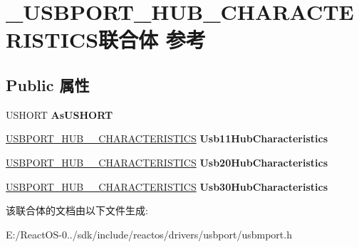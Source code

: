 \hypertarget{union___u_s_b_p_o_r_t___h_u_b___c_h_a_r_a_c_t_e_r_i_s_t_i_c_s}{}\section{\+\_\+\+U\+S\+B\+P\+O\+R\+T\+\_\+\+H\+U\+B\+\_\+\+C\+H\+A\+R\+A\+C\+T\+E\+R\+I\+S\+T\+I\+C\+S联合体 参考}
\label{union___u_s_b_p_o_r_t___h_u_b___c_h_a_r_a_c_t_e_r_i_s_t_i_c_s}
\subsection*{Public 属性}
\begin{DoxyCompactItemize}
\item 
\mbox{\label{union___u_s_b_p_o_r_t___h_u_b___c_h_a_r_a_c_t_e_r_i_s_t_i_c_s_a423d6c5ab8e0105af3857dd810dcba65}} 
U\+S\+H\+O\+RT {\bfseries As\+U\+S\+H\+O\+RT}
\item 
\mbox{\label{union___u_s_b_p_o_r_t___h_u_b___c_h_a_r_a_c_t_e_r_i_s_t_i_c_s_a807bce0510d0d5f481284a3efd21d9ec}} 
\hyperlink{union___u_s_b_p_o_r_t___h_u_b__11___c_h_a_r_a_c_t_e_r_i_s_t_i_c_s}{U\+S\+B\+P\+O\+R\+T\+\_\+\+H\+U\+B\+\_\+\_\+\+C\+H\+A\+R\+A\+C\+T\+E\+R\+I\+S\+T\+I\+CS} {\bfseries Usb11\+Hub\+Characteristics}
\item 
\mbox{\label{union___u_s_b_p_o_r_t___h_u_b___c_h_a_r_a_c_t_e_r_i_s_t_i_c_s_a79d53265692cd0e065828c2fc638d82f}} 
\hyperlink{union___u_s_b_p_o_r_t___h_u_b__20___c_h_a_r_a_c_t_e_r_i_s_t_i_c_s}{U\+S\+B\+P\+O\+R\+T\+\_\+\+H\+U\+B\+\_\+\_\+\+C\+H\+A\+R\+A\+C\+T\+E\+R\+I\+S\+T\+I\+CS} {\bfseries Usb20\+Hub\+Characteristics}
\item 
\mbox{\label{union___u_s_b_p_o_r_t___h_u_b___c_h_a_r_a_c_t_e_r_i_s_t_i_c_s_a24df22f0d0663d03b4290050a7d87d7f}} 
\hyperlink{union___u_s_b_p_o_r_t___h_u_b__11___c_h_a_r_a_c_t_e_r_i_s_t_i_c_s}{U\+S\+B\+P\+O\+R\+T\+\_\+\+H\+U\+B\+\_\+\_\+\+C\+H\+A\+R\+A\+C\+T\+E\+R\+I\+S\+T\+I\+CS} {\bfseries Usb30\+Hub\+Characteristics}
\end{DoxyCompactItemize}


该联合体的文档由以下文件生成\+:\begin{DoxyCompactItemize}
\item 
E\+:/\+React\+O\+S-\/0../sdk/include/reactos/drivers/usbport/usbmport.\+h\end{DoxyCompactItemize}
